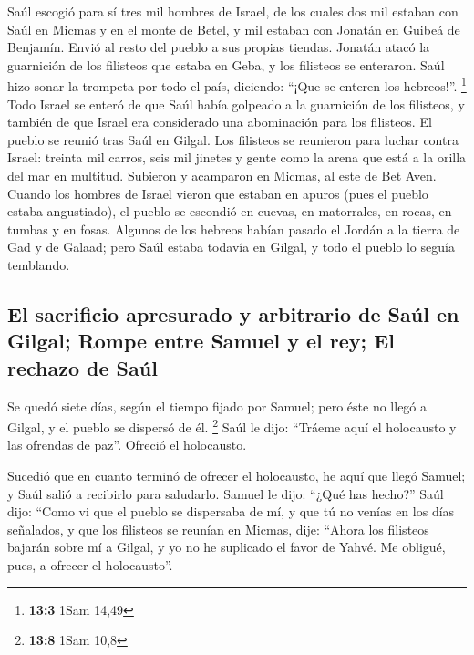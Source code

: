 \begin{paracol}{2}
 Saúl escogió para sí tres mil hombres de Israel, de los
cuales dos mil estaban con Saúl en Micmas y en el monte de Betel, y mil
estaban con Jonatán en Guibeá de Benjamín. Envió al resto del pueblo a
sus propias tiendas.  Jonatán atacó la guarnición de los
filisteos que estaba en Geba, y los filisteos se enteraron. Saúl hizo
sonar la trompeta por todo el país, diciendo: ``¡Que se enteren los
hebreos!''. \footnote{\textbf{13:3} 1Sam 14,49}  Todo
Israel se enteró de que Saúl había golpeado a la guarnición de los
filisteos, y también de que Israel era considerado una abominación para
los filisteos. El pueblo se reunió tras Saúl en Gilgal. 
Los filisteos se reunieron para luchar contra Israel: treinta mil
carros, seis mil jinetes y gente como la arena que está a la orilla del
mar en multitud. Subieron y acamparon en Micmas, al este de Bet Aven.
 Cuando los hombres de Israel vieron que estaban en apuros
(pues el pueblo estaba angustiado), el pueblo se escondió en cuevas, en
matorrales, en rocas, en tumbas y en fosas.  Algunos de
los hebreos habían pasado el Jordán a la tierra de Gad y de Galaad; pero
Saúl estaba todavía en Gilgal, y todo el pueblo lo seguía temblando.

\hypertarget{el-sacrificio-apresurado-y-arbitrario-de-sauxfal-en-gilgal-rompe-entre-samuel-y-el-rey-el-rechazo-de-sauxfal}{%
\subsection{El sacrificio apresurado y arbitrario de Saúl en Gilgal;
Rompe entre Samuel y el rey; El rechazo de
Saúl}\label{el-sacrificio-apresurado-y-arbitrario-de-sauxfal-en-gilgal-rompe-entre-samuel-y-el-rey-el-rechazo-de-sauxfal}}

 Se quedó siete días, según el tiempo fijado por Samuel;
pero éste no llegó a Gilgal, y el pueblo se dispersó de él. \footnote{\textbf{13:8}
  1Sam 10,8}  Saúl le dijo: ``Tráeme aquí el holocausto y
las ofrendas de paz''. Ofreció el holocausto.

 Sucedió que en cuanto terminó de ofrecer el holocausto,
he aquí que llegó Samuel; y Saúl salió a recibirlo para saludarlo.
 Samuel le dijo: ``¿Qué has hecho?'' Saúl dijo: ``Como vi
que el pueblo se dispersaba de mí, y que tú no venías en los días
señalados, y que los filisteos se reunían en Micmas, 
dije: ``Ahora los filisteos bajarán sobre mí a Gilgal, y yo no he
suplicado el favor de Yahvé. Me obligué, pues, a ofrecer el
holocausto''.


\end{paracol}
